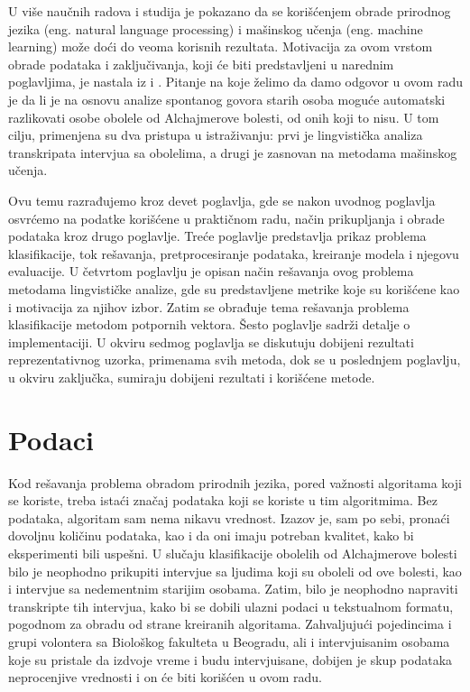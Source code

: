 \documentclass[12pt,oneside]{memoir}
\begin{document}
U više naučnih radova i studija je pokazano da se korišćenjem obrade prirodnog jezika (eng. natural language processing) i mašinskog učenja (eng. machine learning) može doći do veoma korisnih rezultata. Motivacija za ovom vrstom obrade podataka i zaključivanja, koji će biti predstavljeni u narednim poglavljima, je nastala iz \cite{automaticdetandrat} i \cite{linguisticfeatures}.
\newline
\newline
\newline
Pitanje na koje želimo da damo odgovor u ovom radu je da li je na osnovu analize spontanog govora starih osoba moguće automatski razlikovati osobe obolele od Alchajmerove bolesti, od onih koji to nisu. U tom cilju, primenjena su dva pristupa u istraživanju: prvi je lingvistička analiza transkripata intervjua sa obolelima, a drugi je zasnovan na metodama mašinskog učenja. 

Ovu temu razrađujemo kroz devet poglavlja, gde se nakon uvodnog poglavlja osvrćemo na podatke korišćene u praktičnom radu, način prikupljanja i obrade podataka kroz drugo poglavlje. Treće poglavlje predstavlja prikaz problema klasifikacije, tok rešavanja,  pretprocesiranje podataka, kreiranje modela i njegovu evaluacije.  U četvrtom poglavlju je opisan način rešavanja ovog problema metodama lingvističke analize, gde su predstavljene metrike koje su korišćene kao i motivacija za njihov izbor.  Zatim se obrađuje tema rešavanja problema klasifikacije metodom potpornih vektora.  Šesto poglavlje sadrži detalje o implementaciji.  U okviru sedmog poglavlja se diskutuju dobijeni rezultati reprezentativnog uzorka, primenama svih metoda, dok se u poslednjem poglavlju, u okviru zaključka, sumiraju dobijeni rezultati i korišćene metode.

\chapter{Podaci}

Kod rešavanja problema obradom prirodnih jezika, pored važnosti algoritama koji se koriste, treba istaći značaj podataka koji se koriste u tim algoritmima.  Bez podataka, algoritam sam nema nikavu vrednost.  Izazov je, sam po sebi, pronaći dovoljnu količinu podataka, kao i da oni imaju potreban kvalitet, kako bi eksperimenti bili uspešni.  U slučaju klasifikacije obolelih od Alchajmerove bolesti bilo je neophodno prikupiti intervjue sa ljudima koji su oboleli od ove bolesti, kao i intervjue sa nedementnim starijim osobama. Zatim, bilo je neophodno napraviti transkripte tih intervjua, kako bi se dobili ulazni podaci u tekstualnom formatu, pogodnom za obradu od strane kreiranih algoritama. Zahvaljujući pojedincima i grupi volontera sa Biološkog fakulteta u Beogradu, ali i intervjuisanim osobama koje su pristale da izdvoje vreme i budu intervjuisane, dobijen je skup podataka neprocenjive vrednosti i on će biti korišćen u ovom radu.
\end{document}
